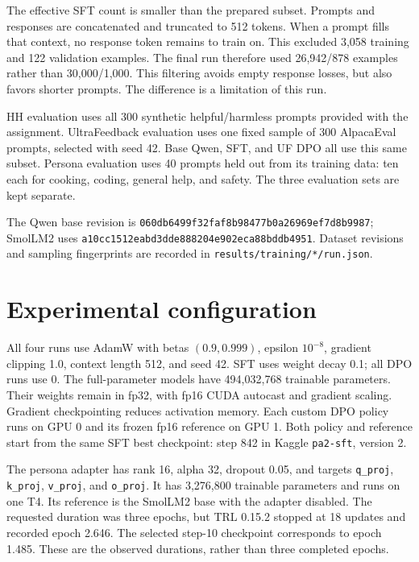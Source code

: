 \documentclass{article}
\begin{document}
The effective SFT count is smaller than the prepared subset. Prompts and responses are concatenated and truncated to 512 tokens. When a prompt fills that context, no response token remains to train on. This excluded 3,058 training and 122 validation examples. The final run therefore used 26,942/878 examples rather than 30,000/1,000. This filtering avoids empty response losses, but also favors shorter prompts. The difference is a limitation of this run.

HH evaluation uses all 300 synthetic helpful/harmless prompts provided with the assignment. UltraFeedback evaluation uses one fixed sample of 300 AlpacaEval~\cite{alpaca} prompts, selected with seed 42. Base Qwen, SFT, and UF DPO all use this same subset. Persona evaluation uses 40 prompts held out from its training data: ten each for cooking, coding, general help, and safety. The three evaluation sets are kept separate.

The Qwen base revision is \texttt{060db6499f32faf8b98477b0a26969ef7d8b9987}; SmolLM2 uses \texttt{a10cc1512eabd3dde888204e902eca88bddb4951}. Dataset revisions and sampling fingerprints are recorded in \texttt{results/training/*/run.json}.

\section{Experimental configuration}
\begin{table}[ht]
\centering
\caption{Actual training configuration. Batch is per policy device; the reference GPU does not double the effective batch. ``Best'' identifies the submitted checkpoint.}
\label{tab:config}

\end{table}

All four runs use AdamW with betas $(0.9,0.999)$, epsilon $10^{-8}$, gradient clipping 1.0, context length 512, and seed 42. SFT uses weight decay 0.1; all DPO runs use 0. The full-parameter models have 494,032,768 trainable parameters. Their weights remain in fp32, with fp16 CUDA autocast and gradient scaling. Gradient checkpointing reduces activation memory. Each custom DPO policy runs on GPU 0 and its frozen fp16 reference on GPU 1. Both policy and reference start from the same SFT best checkpoint: step 842 in Kaggle \texttt{pa2-sft}, version 2.

The persona adapter has rank 16, alpha 32, dropout 0.05, and targets \texttt{q\_proj}, \texttt{k\_proj}, \texttt{v\_proj}, and \texttt{o\_proj}. It has 3,276,800 trainable parameters and runs on one T4. Its reference is the SmolLM2 base with the adapter disabled. The requested duration was three epochs, but TRL 0.15.2 stopped at 18 updates and recorded epoch 2.646. The selected step-10 checkpoint corresponds to epoch 1.485. These are the observed durations, rather than three completed epochs.
\end{document}
